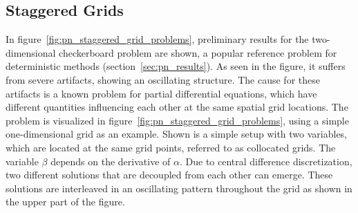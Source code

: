 \subsection{Staggered Grids}
\label{sec:pn_staggered}

In figure~\ref{fig:pn_staggered_grid_problems}, preliminary results for the two-dimensional checkerboard problem are shown, a popular reference problem for deterministic methods (section~\ref{sec:pn_results}). As seen in the figure, it suffers from severe artifacts, showing an oscillating structure. The cause for these artifacts is a known problem for partial differential equations, which have different quantities influencing each other at the same spatial grid locations. The problem is visualized in figure~\ref{fig:pn_staggered_grid_problems}, using a simple one-dimensional grid as an example. Shown is a simple setup with two variables, which are located at the same grid points, referred to as collocated grids. The variable $\beta$ depends on the derivative of $\alpha$. Due to central difference discretization, two different solutions that are decoupled from each other can emerge. These solutions are interleaved in an oscillating pattern throughout the grid as shown in the upper part of the figure.

